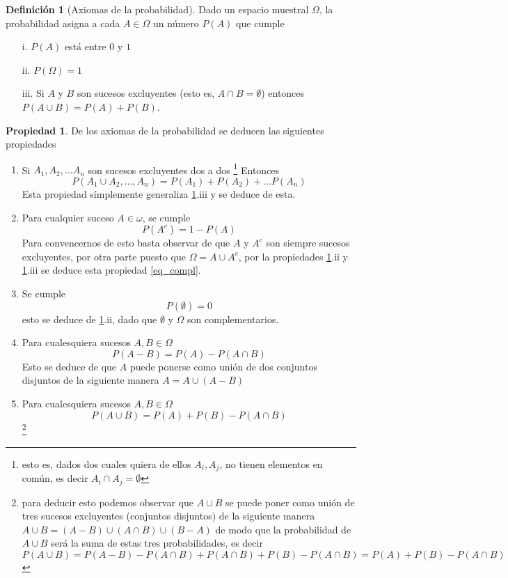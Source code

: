 \documentclass[]{book}
\theoremstyle{plain}
\theoremstyle{definition}
\newtheorem{definition}[theorem]{Definición}
\newtheorem{property}[theorem]{Propiedad}
\begin{document}
\begin{definition}[Axiomas de la probabilidad]\label{def_axiom}
Dado un espacio muestral $\Omega$, la probabilidad asigna a cada $A\in \Omega$ un número
$P(A)$ que cumple
\begin{enumerate}
  \item[i.] $P(A)$ está entre $0$ y $1$
  \item[ii.] $P(\Omega) = 1$
  \item[iii.] Si $A$ y $B$ son sucesos excluyentes (esto es, $A\cap B = \emptyset$) entonces $P(A\cup B) = P(A) + P(B)$.
\end{enumerate}
\end{definition}

\begin{property}
  De los axiomas de la probabilidad se deducen las siguientes propiedades
\begin{enumerate}[(1)]
  \item Si $A_1, A_2, \ldots A_n$ son sucesos excluyentes dos a dos \footnote{esto es, dados dos cuales quiera de ellos $A_i, A_j$, no tienen elementos en común, es decir $A_i\cap A_j = \emptyset$}
  Entonces $$P(A_1 \cup A_2, \ldots, A_n)=P(A_1) + P(A_2) + \ldots P(A_n)$$
  Esta propiedad símplemente generaliza \ref{def_axiom}.iii y se deduce de esta.
  \item Para cualquier suceso $A\in \omega$, se cumple
  \begin{equation}\label{eq_compl}
    P(A^c) = 1-P(A)
  \end{equation}
  Para convencernos de esto basta observar de que $A$ y $A^c$ son siempre sucesos excluyentes, 
  por otra parte puesto que $\Omega = A \cup A^c$, por la propiedades \ref{def_axiom}.ii y \ref{def_axiom}.iii se deduce esta propiedad \ref{eq_compl}. 
  \item Se cumple
  \[P(\emptyset) = 0 \]
  esto se deduce de \ref{def_axiom}.ii, dado que $\emptyset$ y $\Omega$ son complementarios.
  \item Para cualesquiera sucesos $A,B\in \Omega$
  \[P(A-B)= P(A) - P(A\cap B)\]
  Esto se deduce de que $A$ puede ponerse como unión de dos conjuntos disjuntos de la siguiente manera $A = A \cup (A-B)$
  \item Para cualesquiera sucesos $A,B\in \Omega$
  \[P(A\cup B) = P(A) + P(B) - P(A\cap B)\]
  \footnote{para deducir esto podemos observar que $A\cup B $ se puede poner como unión de tres sucesos excluyentes (conjuntos disjuntos) de la siguiente manera 
   $A\cup B = (A-B) \cup (A\cap B) \cup (B-A)$ de modo que la probabilidad de $A\cup B$ será la suma de estas tres probabilidades, es decir 
   \[P(A\cup B) = P(A-B) - P(A\cap B) + P(A\cap B) + P(B) - P(A\cap B) = P(A) + P(B) - P(A\cap B) \]}
\end{enumerate}
\end{property}
\end{document}
